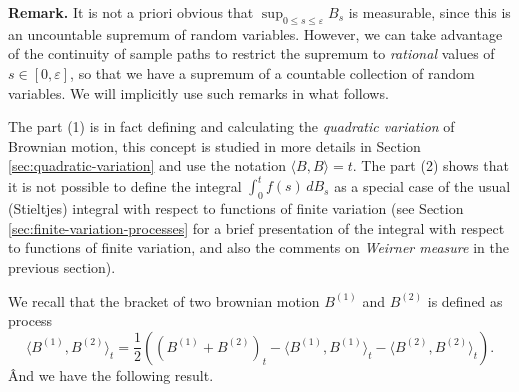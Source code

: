 \documentclass[../Main.tex]{subfiles}
\begin{document}
\noindent\textbf{Remark.} It is not a priori obvious that $\sup_{0\leq s\leq \varepsilon} B_s$ is measurable, since this is an uncountable supremum of random variables. However, we can take advantage of the continuity of sample paths to restrict the supremum to \emph{rational} values of $s\in[0,\varepsilon]$, so that we have a supremum of a countable collection of random variables. We will implicitly use such remarks in what follows.
 
 
 
The part (1) is in fact defining and calculating the \emph{quadratic variation} of Brownian motion, this concept is studied in more details in Section \ref{sec:quadratic-variation} and use the notation $\langle B, B \rangle = t$.
The part (2) shows that it is not possible to define the integral $\int_0^t f(s)\,dB_s$ as a special case of the usual (Stieltjes) integral with respect to functions of finite variation (see Section \ref{sec:finite-variation-processes} for a brief presentation of the integral with respect to functions of finite variation, and also the comments on \textit{Weirner measure} in the previous section).

We recall that the bracket of two brownian motion $B^{(1)}$ and $B^{(2)}$ is defined as process 
\[
\langle B^{(1)}, B^{(2)} \rangle_t = \frac{1}{2}\left((B^{(1)}+B^{(2)})_t - \langle B^{(1)}, B^{(1)} \rangle_t - \langle B^{(2)}, B^{(2)} \rangle_t\right).
\]
Ând we have the following result.
\end{document}
